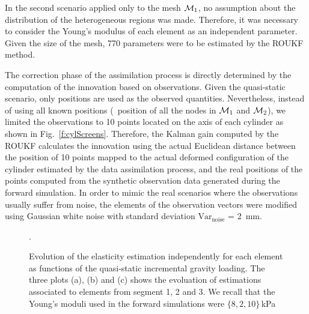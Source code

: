 In the second scenario applied only to the mesh $\mathcal{M}_1$, no assumption about the distribution of the heterogeneous regions was made. 
Therefore, it was necessary to consider the Young's modulus of each element as an independent parameter. Given the size of the 
mesh, 770 parameters were to be estimated by the ROUKF method.  

The correction phase of the assimilation process is directly determined by the computation of the innovation based on observations.
Given the quasi-static scenario, only positions are used as the observed quantities. 
Nevertheless, instead of using all known positions (\ie\ position of all the nodes 
in $\mathcal{M}_1$ and $\mathcal{M}_2$), we limited the observations to 10 points located on the axis of each cylinder as shown in Fig.~\ref{f:cylScreens}. 
Therefore, the Kalman gain computed by the ROUKF calculates the innovation using the actual Euclidean distance between the position of 10 points 
mapped to the actual deformed configuration of the cylinder estimated by the data assimilation process, and the real positions of 
the points computed from the synthetic observation data generated during the forward simulation. In order to mimic the 
real scenarios where the observations usually suffer from noise, the elements of the observation vectors were modified using 
Gaussian white noise with standard deviation $\text{Var}_\text{noise}$ = \SI{2}{\mm}.



\begin{figure}[t!]%
\centering%
\hfill
{}
\hfill
{}
\caption{Evolution of the elasticity estimation independently for each element as functions of the quasi-static incremental gravity loading.
The three plots (a), (b) and (c) shows the evoluation of estimations associated to elements from segment 1, 2 and 3. We recall that 
the Young's moduli used in the forward simulations were $\{8,2,10\}$\,kPa}.%
\label{f:cyl3EAsegs}
\end{figure}


